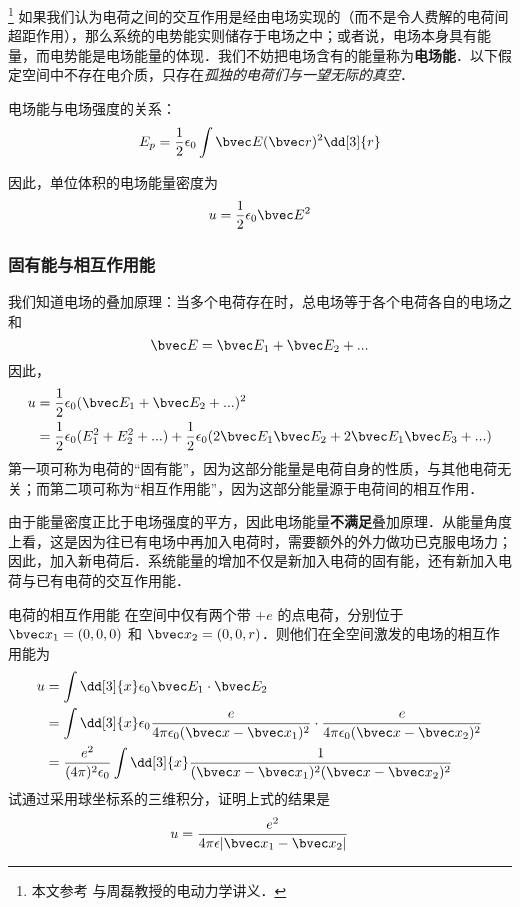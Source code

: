 
\footnote{本文参考 \cite{GriffE} 与周磊教授的电动力学讲义．}
如果我们认为电荷之间的交互作用是经由电场实现的（而不是令人费解的电荷间超距作用），那么系统的电势能实则储存于电场之中；或者说，电场本身具有能量，而电势能是电场能量的体现．我们不妨把电场含有的能量称为\textbf{电场能}．以下假定空间中不存在电介质，只存在\textsl{孤独的电荷们与一望无际的真空}．

电场能与电场强度的关系：
\begin{equation}\label{EEng_eq2}
E_p = \frac12 \epsilon_0 \int \bvec E(\bvec r)^2 \dd[3]{r}
\end{equation}

因此，单位体积的电场能量密度为
\begin{equation}
u = \frac12 \epsilon_0 \bvec E^2
\end{equation}

\subsubsection{固有能与相互作用能}
我们知道电场的叠加原理：当多个电荷存在时，总电场等于各个电荷各自的电场之和
$$
\bvec E = \bvec E_1 + \bvec E_2 +... 
$$
因此，
$$
\begin{aligned}
u &= \frac12 \epsilon_0 (\bvec E_1 + \bvec E_2 +... )^2\\
&=\frac12 \epsilon_0(E_1^2+E_2^2+...)+\frac12 \epsilon_0 (2\bvec E_1 \bvec E_2+2\bvec E_1 \bvec E_3+...)
\end{aligned}
$$
第一项可称为电荷的“固有能”，因为这部分能量是电荷自身的性质，与其他电荷无关；而第二项可称为“相互作用能”，因为这部分能量源于电荷间的相互作用．

由于能量密度正比于电场强度的平方，因此电场能量\textbf{不满足}叠加原理．从能量角度上看，这是因为往已有电场中再加入电荷时，需要额外的外力做功已克服电场力；因此，加入新电荷后．系统能量的增加不仅是新加入电荷的固有能，还有新加入电荷与已有电荷的交互作用能．
\begin{exercise}{电荷的相互作用能}
在空间中仅有两个带 $+e$ 的点电荷，分别位于 $\bvec x_1=(0,0,0)$ 和 $\bvec x_2=(0,0,r)$．则他们在全空间激发的电场的相互作用能为
\begin{equation}
\begin{aligned}
u&=\int \dd[3]{x} \epsilon_0 \bvec E_1\cdot \bvec E_2\\
&=\int \dd[3]{x} \epsilon_0 \frac{e}{4\pi\epsilon_0(\bvec x-\bvec x_1)^2}\cdot \frac{e}{4\pi\epsilon_0(\bvec x-\bvec x_2)^2}\\
&=\frac{e^2}{(4\pi)^2\epsilon_0} \int\dd[3]{x} \frac{1}{(\bvec x-\bvec x_1)^2(\bvec x-\bvec x_2)^2}
\end{aligned}
\end{equation}
试通过采用球坐标系的三维积分，证明上式的结果是
\begin{equation}
u=\frac{e^2}{4\pi \epsilon|\bvec x_1-\bvec x_2|}
\end{equation}
\end{exercise}

